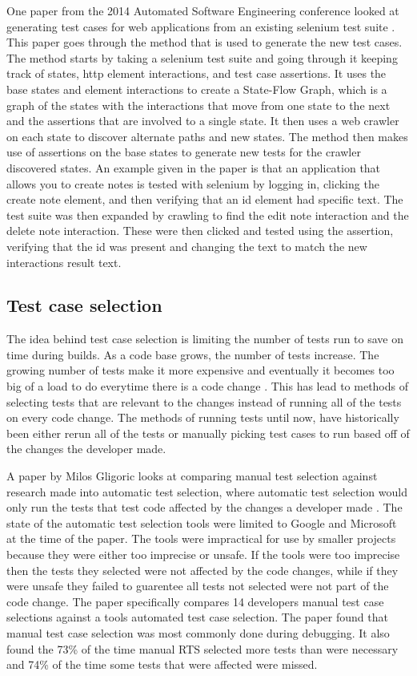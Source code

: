     One paper from the 2014 Automated Software Engineering conference looked at generating test cases for web applications from an existing selenium test suite \cite{WebTestGeneration}. 
    This paper goes through the method that is used to generate the new test cases. The method starts by taking a selenium test suite and going through it keeping track of states, 
    http element interactions, and test case assertions. It uses the base states and element interactions to create a State-Flow Graph, which is a graph of the states with the interactions 
    that move from one state to the next and the assertions that are involved to a single state. It then uses a web crawler on each state to discover alternate paths and new states. 
    The method then makes use of assertions on the base states to generate new tests for the crawler discovered states. An example given in the paper is that an application that allows you to 
    create notes is tested with selenium by logging in, clicking the create note element, and then verifying that an id element had specific text. The test suite was then expanded by crawling
    to find the edit note interaction and the delete note interaction. These were then clicked and tested using the assertion, verifying that the id was present and changing the text to match the
    new interactions result text.

\subsection{Test case selection}
    The idea behind test case selection is limiting the number of tests run to save on time during builds. As a code base grows, the number of tests increase. The growing number of tests make it more 
    expensive and eventually it becomes too big of a load to do everytime there is a code change \cite{googletest, googlescale}. This has lead to methods of selecting tests that are relevant to the 
    changes instead of running all of the tests on every code change. The methods of running tests until now, have historically been either rerun all of the tests or manually picking test cases to 
    run based off of the changes the developer made.

    A paper by Milos Gligoric looks at comparing manual test selection against research made into automatic test selection, where automatic test selection would only run the tests that test code
    affected by the changes a developer made \cite{TestCaseSelction}. The state of the automatic test selection tools were limited to Google and Microsoft at the time of the paper. The tools were
    impractical for use by smaller projects because they were either too imprecise or unsafe. If the tools were too imprecise then the tests they selected were not affected by the code changes, while
    if they were unsafe they failed to guarentee all tests not selected were not part of the code change. The paper specifically compares 14 developers manual test case selections against a tools 
    automated test case selection. The paper found that manual test case selection was most commonly done during debugging. It also found the 73\% of the time manual RTS selected more tests than were 
    necessary and 74\% of the time some tests that were affected were missed.

